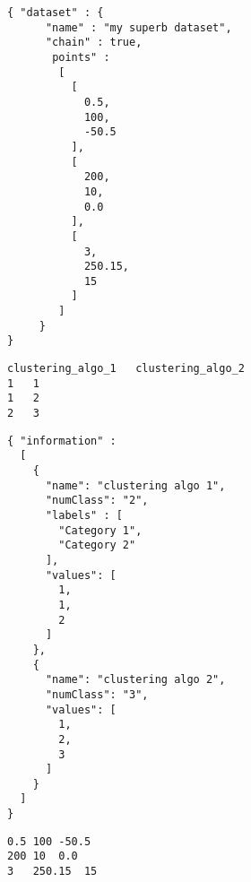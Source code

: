 \documentclass[10pt]{bmc_article}
\newenvironment{bmcformat}{\baselineskip20pt\sloppy\setboolean{publ}{false}}{\baselineskip20pt\sloppy}
\begin{document}
\begin{bmcformat}
\begin{lstlisting}[float,caption=Json dataset file,label=jsondataset]
{ "dataset" : {
      "name" : "my superb dataset",
      "chain" : true,
       points" :
        [
          [
            0.5,
            100,
            -50.5
          ],
          [
            200,
            10,
            0.0
          ],
          [
            3,
            250.15,
            15
          ]
        ]
     }
}
\end{lstlisting}


\begin{lstlisting}[float,caption=CSV information layer file,label=csvinfo]
clustering_algo_1	clustering_algo_2
1	1
1	2
2	3
\end{lstlisting}

\begin{lstlisting}[float,caption=JSON information layer file,label=jsoninfo]
{ "information" :
  [
    {
      "name": "clustering algo 1",
      "numClass": "2",
      "labels" : [
        "Category 1",
        "Category 2"
      ],
      "values": [
        1,
        1,
        2
      ]
    },
    {
      "name": "clustering algo 2",
      "numClass": "3",
      "values": [
        1,
        2,
        3
      ]
    }
  ]
}
\end{lstlisting}

\begin{lstlisting}[float,caption=CSV dataset file,label=csvdataset]
0.5	100	-50.5
200	10	0.0
3	250.15	15
\end{lstlisting}








\end{bmcformat}
\end{document}
